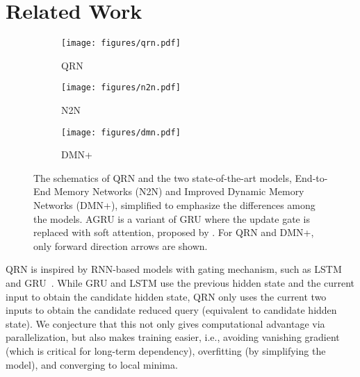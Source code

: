 \documentclass[table]{article}
\begin{document}
 
\section{Related Work}\label{sec:rel}





\begin{figure}[t]

\begin{subfigure}[htbp]{0.32\textwidth}
\centering
\texttt{[image: figures/qrn.pdf]}
\caption{  QRN }
\label{fig:qrn}
\end{subfigure}
\begin{subfigure}[htbp]{0.32\textwidth}
\centering
\texttt{[image: figures/n2n.pdf]}
\caption{ N2N~\citep{memN2N} }
\label{fig:memn2n}
\end{subfigure}
\begin{subfigure}[htbp]{0.32\textwidth}
\centering
\texttt{[image: figures/dmn.pdf]}
\caption{ DMN+~\citep{DMN+} }
\label{fig:dmn}
\end{subfigure}
\caption{\small The schematics of QRN and the two state-of-the-art models, End-to-End Memory Networks (N2N) and Improved Dynamic Memory Networks (DMN+), simplified to emphasize the differences among the models. 
AGRU is a variant of GRU where the update gate is replaced with soft attention, proposed by \citet{DMN}.
For QRN and DMN+, only forward direction arrows are shown.}
\label{fig:models}
\end{figure}

QRN is inspired by RNN-based models with gating mechanism, such as LSTM~\citep{lstm} and GRU~\citep{GRU}.
While GRU and LSTM use the previous hidden state and the current input to obtain the candidate hidden state, QRN only uses the current two inputs to obtain the candidate reduced query (equivalent to candidate hidden state).
We conjecture that this not only gives computational advantage via parallelization, but also makes training easier, i.e., avoiding vanishing gradient (which is critical for long-term dependency), overfitting (by simplifying the model), and converging to local minima.
\end{document}
